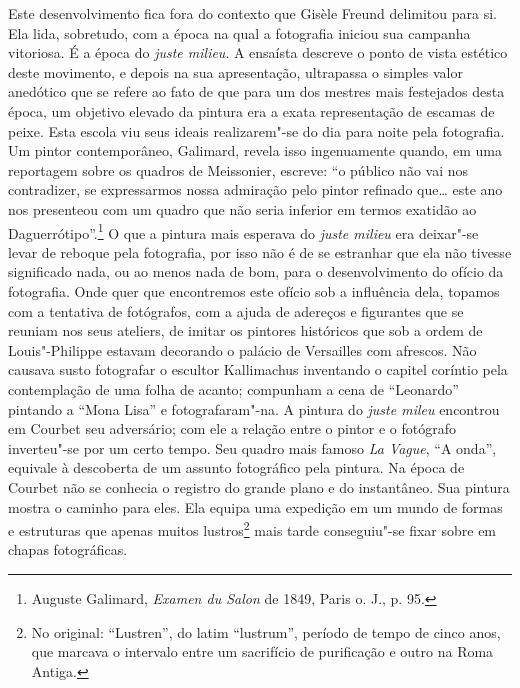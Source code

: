 Este desenvolvimento fica fora do contexto que Gisèle Freund delimitou
para si. Ela lida, sobretudo, com a época na qual a fotografia iniciou
sua campanha vitoriosa. É a época do \emph{juste milieu}. A ensaísta
descreve o ponto de vista estético deste movimento, e depois na sua
apresentação, ultrapassa o simples valor anedótico que se refere ao fato
de que para um dos mestres mais festejados desta época, um objetivo
elevado da pintura era a exata representação de escamas de peixe. Esta
escola viu seus ideais realizarem"-se do dia para noite pela fotografia.
Um pintor contemporâneo, Galimard, revela isso ingenuamente quando, em
uma reportagem sobre os quadros de Meissonier, escreve: ``o público não
vai nos contradizer, se expressarmos nossa admiração pelo pintor
refinado que\ldots{} este ano nos presenteou com um quadro que não seria
inferior em termos exatidão ao Daguerrótipo''.\footnote{Auguste Galimard,
  \emph{Examen du Salon} de 1849, Paris o. J., p. 95.} O que a pintura
mais esperava do \emph{juste milieu} era deixar"-se levar de reboque pela
fotografia, por isso não é de se estranhar que ela não tivesse
significado nada, ou ao menos nada de bom, para o desenvolvimento do
ofício da fotografia. Onde quer que encontremos este ofício sob a
influência dela, topamos com a tentativa de fotógrafos, com a ajuda de
adereços e figurantes que se reuniam nos seus ateliers, de imitar os
pintores históricos que sob a ordem de Louis"-Philippe estavam decorando
o palácio de Versailles com afrescos. Não causava susto fotografar o
escultor Kallimachus inventando o capitel coríntio pela contemplação de
uma folha de acanto; compunham a cena de ``Leonardo'' pintando a ``Mona
Lisa'' e fotografaram"-na. A pintura do \emph{juste mileu} encontrou em
Courbet seu adversário; com ele a relação entre o pintor e o fotógrafo
inverteu"-se por um certo tempo. Seu quadro mais famoso \emph{La Vague},
``A onda'', equivale à descoberta de um assunto fotográfico pela
pintura. Na época de Courbet não se conhecia o registro do grande plano
e do instantâneo. Sua pintura mostra o caminho para eles. Ela equipa uma
expedição em um mundo de formas e estruturas que apenas muitos
lustros\footnote{No original: ``Lustren'', do latim ``lustrum'',
  período de tempo de cinco anos, que marcava o intervalo entre um
  sacrifício de purificação e outro na Roma Antiga. \versal{[N. T.]}} mais tarde
conseguiu"-se fixar sobre em chapas fotográficas.

